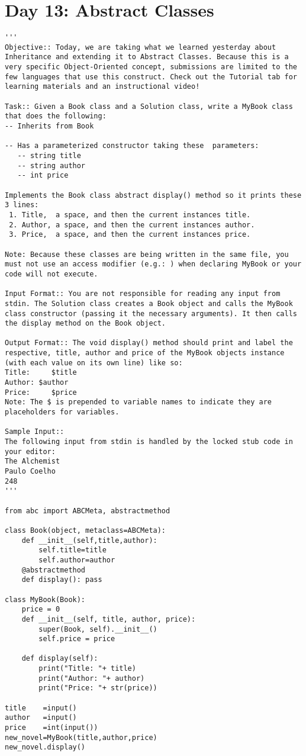 \documentclass[11pt,a4paper]{article}
\begin{document}
\newpage
\section{Day 13: Abstract Classes}

\begin{lstlisting}
'''
Objective:: Today, we are taking what we learned yesterday about Inheritance and extending it to Abstract Classes. Because this is a very specific Object-Oriented concept, submissions are limited to the few languages that use this construct. Check out the Tutorial tab for learning materials and an instructional video!

Task:: Given a Book class and a Solution class, write a MyBook class that does the following:
-- Inherits from Book

-- Has a parameterized constructor taking these  parameters:
   -- string title
   -- string author
   -- int price
   
Implements the Book class abstract display() method so it prints these 3 lines:
 1. Title,  a space, and then the current instances title. 
 2. Author, a space, and then the current instances author. 
 3. Price,  a space, and then the current instances price.

Note: Because these classes are being written in the same file, you
must not use an access modifier (e.g.: ) when declaring MyBook or your
code will not execute.

Input Format:: You are not responsible for reading any input from stdin. The Solution class creates a Book object and calls the MyBook class constructor (passing it the necessary arguments). It then calls the display method on the Book object.

Output Format:: The void display() method should print and label the respective, title, author and price of the MyBook objects instance (with each value on its own line) like so:
Title:     $title
Author: $author
Price:     $price
Note: The $ is prepended to variable names to indicate they are placeholders for variables.

Sample Input::
The following input from stdin is handled by the locked stub code in your editor:
The Alchemist
Paulo Coelho
248
'''

from abc import ABCMeta, abstractmethod

class Book(object, metaclass=ABCMeta):
    def __init__(self,title,author):
        self.title=title
        self.author=author   
    @abstractmethod
    def display(): pass

class MyBook(Book):
    price = 0
    def __init__(self, title, author, price):
        super(Book, self).__init__()
        self.price = price 

    def display(self):
        print("Title: "+ title)
        print("Author: "+ author)
        print("Price: "+ str(price))

title    =input()
author   =input()
price    =int(input())
new_novel=MyBook(title,author,price)
new_novel.display()
\end{lstlisting}
\end{document}
